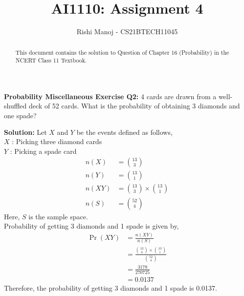 \documentclass[journal,12pt,twocolumn]{IEEEtran}
\begin{document}
	
	
	\providecommand{\mbf}{\mathbf}
	\providecommand{\pr}[1]{\ensuremath{\Pr\left(#1\right)}}
	\providecommand{\qfunc}[1]{\ensuremath{Q\left(#1\right)}}
	\providecommand{\sbrak}[1]{\ensuremath{{}\left[#1\right]}}
	\providecommand{\lsbrak}[1]{\ensuremath{{}\left[#1\right.}}
	\providecommand{\rsbrak}[1]{\ensuremath{{}\left.#1\right]}}
	\providecommand{\brak}[1]{\ensuremath{\left(#1\right)}}
	\providecommand{\lbrak}[1]{\ensuremath{\left(#1\right.}}
	\providecommand{\rbrak}[1]{\ensuremath{\left.#1\right)}}
	\providecommand{\cbrak}[1]{\ensuremath{\left\{#1\right\}}}
	\providecommand{\lcbrak}[1]{\ensuremath{\left\{#1\right.}}
	\providecommand{\rcbrak}[1]{\ensuremath{\left.#1\right\}}}
	\providecommand{\dec}[2]{\ensuremath{\overset{#1}{\underset{#2}{\gtrless}}}}
	\newcommand{\myvec}[1]{\ensuremath{\begin{pmatrix}#1\end{pmatrix}}}
	\newcommand{\mydet}[1]{\ensuremath{\begin{vmatrix}#1\end{vmatrix}}}
	\newcommand*{\permcomb}[4][0mu]{{{}^{#3}\mkern#1#2_{#4}}}
	\newcommand*{\perm}[1][-3mu]{\permcomb[#1]{P}}
	\newcommand*{\comb}[1][-1mu]{\permcomb[#1]{C}}
		\title{
				AI1110: Assignment 4
		}
		\author{
			Rishi Manoj - CS21BTECH11045
		}
			
	\maketitle
    \begin{abstract}
		This document contains the solution to Question of Chapter 16 (Probability) in the NCERT Class 11 Textbook.
    \end{abstract}
	
    \textbf{Probability Miscellaneous Exercise Q2:}
	4 cards are drawn from a well-shuffled deck of 52 cards. What is the probability of obtaining 3 diamonds and one spade?
	
	\textbf{Solution:}
	Let $X$ and $Y$ be the events defined as follows,\\
	$X$ : Picking three diamond cards \\
	$Y$ : Picking a spade card \\
	\begin{align}
	n(X) &= {13 \choose 3} \\
	n(Y) &= {13 \choose 1} \\
	n(X Y) &= {13 \choose 3} \times {13 \choose 1} \\
	n(S) &= {52 \choose 4}
	\end{align}
	Here, $S$ is the sample space.\\
	Probability of getting 3 diamonds and 1 spade is given by,
	\begin{align}
	\pr{X Y} &= \frac{n(X Y)}{n(S)} \\
	&= \frac{{13 \choose 3} \times {13 \choose 1}}{{52 \choose 4}} \\
	&= \frac{3178}{270725} \\
	&= 0.0137
	\end{align}
	Therefore, the probability of getting 3 diamonds and 1 spade is 0.0137.
\end{document}
